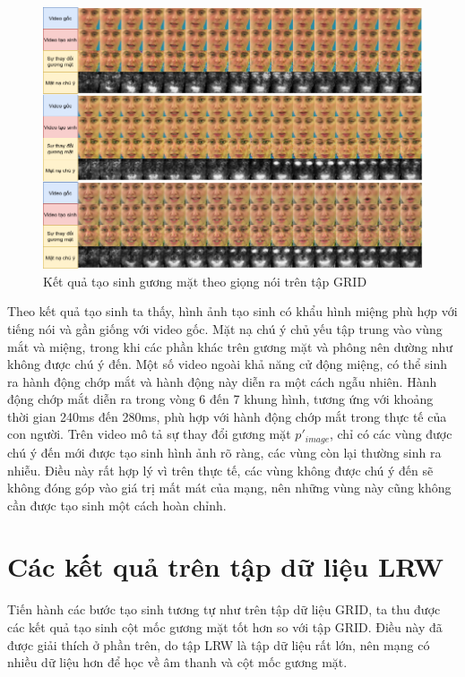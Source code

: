 \begin{figure}[H]
    \centering
    \includegraphics[width=15cm]{./content/materials/grid_examples-face.png}
    \caption{Kết quả tạo sinh gương mặt theo giọng nói trên tập GRID}
\end{figure}

Theo kết quả tạo sinh ta thấy, hình ảnh tạo sinh có khẩu hình miệng phù hợp với tiếng nói và gần giống với video gốc. Mặt nạ chú ý chủ yếu tập trung vào vùng mắt và miệng, trong khi các phần khác trên gương mặt và phông nên dường như không được chú ý đến. Một số video ngoài khả năng cử động miệng, có thể sinh ra hành động chớp mắt và hành động này diễn ra một cách ngẫu nhiên. Hành động chớp mắt diễn ra trong vòng 6 đến 7 khung hình, tương ứng với khoảng thời gian 240ms đến 280ms, phù hợp với hành động chớp mắt trong thực tế của con người. Trên video mô tả sự thay đổi gương mặt $p'_{image}$, chỉ có các vùng được chú ý đến mới được tạo sinh hình ảnh rõ ràng, các vùng còn lại thường sinh ra nhiễu. Điều này rất hợp lý vì trên thực tế, các vùng không được chú ý đến sẽ không đóng góp vào giá trị mất mát của mạng, nên những vùng này cũng không cần được tạo sinh một cách hoàn chỉnh.

\section{Các kết quả trên tập dữ liệu LRW}
Tiến hành các bước tạo sinh tương tự như trên tập dữ liệu GRID, ta thu được các kết quả tạo sinh cột mốc gương mặt tốt hơn so với tập GRID. Điều này đã được giải thích ở phần trên, do tập LRW là tập dữ liệu rất lớn, nên mạng có nhiều dữ liệu hơn để học về âm thanh và cột mốc gương mặt.

